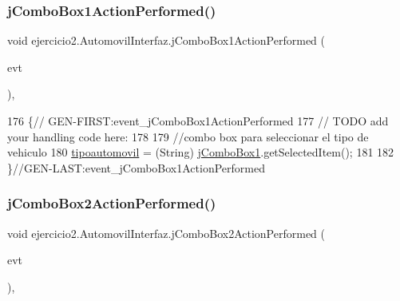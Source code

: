 \subsubsection{\texorpdfstring{j\+Combo\+Box1\+Action\+Performed()}{jComboBox1ActionPerformed()}}
{\footnotesize\ttfamily void ejercicio2.\+Automovil\+Interfaz.\+j\+Combo\+Box1\+Action\+Performed (\begin{DoxyParamCaption}\item[{java.\+awt.\+event.\+Action\+Event}]{evt }\end{DoxyParamCaption})\hspace{0.3cm}{\ttfamily [inline]}, {\ttfamily [private]}}


\begin{DoxyCode}
176                                                                            \{\textcolor{comment}{//
      GEN-FIRST:event\_jComboBox1ActionPerformed}
177         \textcolor{comment}{// TODO add your handling code here:}
178         
179         \textcolor{comment}{//combo box para seleccionar el tipo de vehiculo}
180         \mbox{\hyperlink{classejercicio2_1_1_automovil_interfaz_ae53ea3336ded07ff47311d4e6d56cdb7}{tipoautomovil}} = (String) \mbox{\hyperlink{classejercicio2_1_1_automovil_interfaz_af9e55c9052d02aceba060beb8283c4f2}{jComboBox1}}.getSelectedItem();
181         
182     \}\textcolor{comment}{//GEN-LAST:event\_jComboBox1ActionPerformed}
\end{DoxyCode}
\mbox{\label{classejercicio2_1_1_automovil_interfaz_abe380cd2d77594984defa61f7adcbae2}} 
\subsubsection{\texorpdfstring{j\+Combo\+Box2\+Action\+Performed()}{jComboBox2ActionPerformed()}}
{\footnotesize\ttfamily void ejercicio2.\+Automovil\+Interfaz.\+j\+Combo\+Box2\+Action\+Performed (\begin{DoxyParamCaption}\item[{java.\+awt.\+event.\+Action\+Event}]{evt }\end{DoxyParamCaption})\hspace{0.3cm}{\ttfamily [inline]}, {\ttfamily [private]}}


